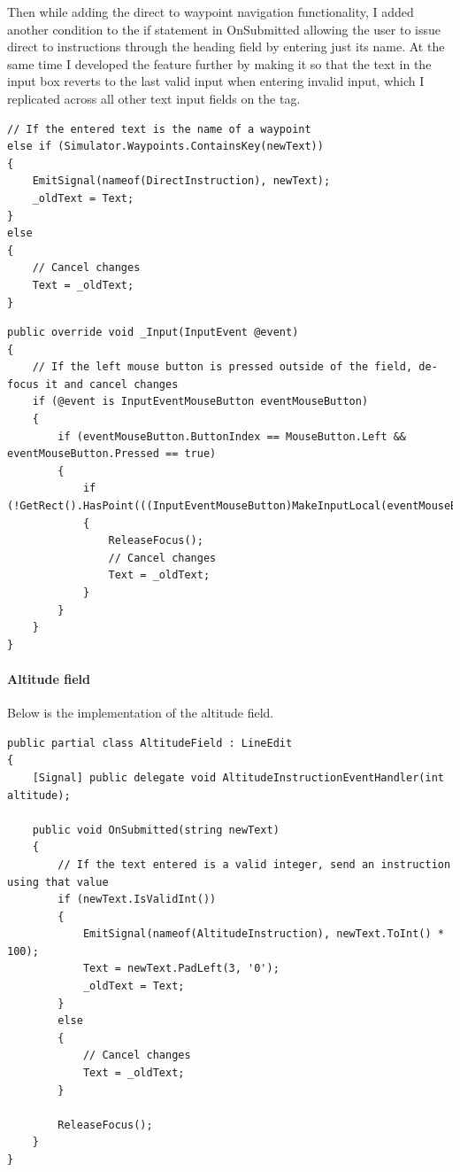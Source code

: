 \documentclass{article}
\begin{document}
Then while adding the direct to waypoint navigation functionality, I added another condition to the if statement in OnSubmitted allowing the user to issue direct to instructions through the heading field by entering just its name.
At the same time I developed the feature further by making it so that the text in the input box reverts to the last valid input when entering invalid input, which I replicated across all other text input fields on the tag.
\lstset{style=csharp}
\begin{lstlisting}[caption=Heading field script]
// If the entered text is the name of a waypoint
else if (Simulator.Waypoints.ContainsKey(newText))
{
    EmitSignal(nameof(DirectInstruction), newText);
    _oldText = Text;
}
else
{
    // Cancel changes
    Text = _oldText;
}
\end{lstlisting}
\lstset{style=csharp}
\begin{lstlisting}[caption=Input field de-focus and canceling changes]
public override void _Input(InputEvent @event)
{
    // If the left mouse button is pressed outside of the field, de-focus it and cancel changes
    if (@event is InputEventMouseButton eventMouseButton)
    {
        if (eventMouseButton.ButtonIndex == MouseButton.Left && eventMouseButton.Pressed == true)
        {
            if (!GetRect().HasPoint(((InputEventMouseButton)MakeInputLocal(eventMouseButton)).Position))
            {
                ReleaseFocus();
                // Cancel changes
                Text = _oldText;
            }
        }
    }    
}
\end{lstlisting}

\paragraph{Altitude field}
Below is the implementation of the altitude field.
\lstset{style=csharp}
\begin{lstlisting}[caption=Altitude field script]
public partial class AltitudeField : LineEdit
{
    [Signal] public delegate void AltitudeInstructionEventHandler(int altitude);

    public void OnSubmitted(string newText) 
    {
        // If the text entered is a valid integer, send an instruction using that value
        if (newText.IsValidInt())
        {
            EmitSignal(nameof(AltitudeInstruction), newText.ToInt() * 100);
            Text = newText.PadLeft(3, '0');
            _oldText = Text;
        }
        else
        {
            // Cancel changes
            Text = _oldText;
        }

        ReleaseFocus();
    }
}
\end{lstlisting}
\end{document}
